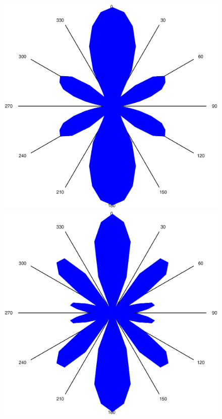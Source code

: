 \begin{figure}
\begin{minipage}{0.45\textwidth}
\end{minipage}
\begin{minipage}{0.45\textwidth}
\centering
\includegraphics[width=\linewidth,keepaspectratio]{FP-V23data/2.3_4985.394Hz.eps}
\includegraphics[width=\linewidth,keepaspectratio]{FP-V23data/2.3_6230.866Hz.eps}

\end{minipage}
\end{figure}
